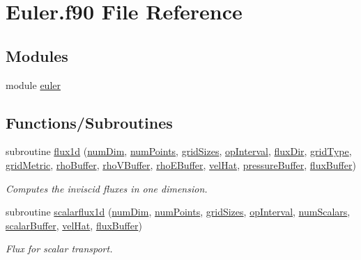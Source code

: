 \hypertarget{Euler_8f90}{}\section{Euler.\+f90 File Reference}
\label{Euler_8f90}
\subsection*{Modules}
\begin{DoxyCompactItemize}
\item 
module \hyperlink{namespaceeuler}{euler}
\end{DoxyCompactItemize}
\subsection*{Functions/\+Subroutines}
\begin{DoxyCompactItemize}
\item 
subroutine \hyperlink{namespaceeuler_a75d1a7e992d0b046ee381c90d22d4c44}{flux1d} (\hyperlink{SATKernels_8H_a680185db8546de161968dabace9e94f1}{num\+Dim}, \hyperlink{ViscidKernels_8H_adf0bf75d0875d1bb42a5348bee7b7bfd}{num\+Points}, \hyperlink{ViscidKernels_8H_a969a5d6106eec8b7096250b27865b9ba}{grid\+Sizes}, \hyperlink{WENOKernels_8H_a23d86f4608a92738225f87574392b273}{op\+Interval}, \hyperlink{ViscidKernels_8H_a466b72ae195460a9c9f2d36373803dc5}{flux\+Dir}, \hyperlink{WENOKernels_8H_ab35a6cf312bb0fddda7097a149c3e946}{grid\+Type}, \hyperlink{WENOKernels_8H_a901f07fa4e3f966a2f6951d6c5974e89}{grid\+Metric}, \hyperlink{WENOKernels_8H_a7f8551332dfedc9c12724ab3903db88c}{rho\+Buffer}, \hyperlink{WENOKernels_8H_aaddaafee4b407fa52d0756171ec50a51}{rho\+V\+Buffer}, \hyperlink{WENOKernels_8H_a355f99edd58be395aedbe083ffca12b0}{rho\+E\+Buffer}, \hyperlink{MetricKernels_8H_a05a5c93e8f43d622b504e02893ae3d66}{vel\+Hat}, \hyperlink{WENOKernels_8H_ad7fb6f5370938321db995446ba47c04b}{pressure\+Buffer}, \hyperlink{ViscidKernels_8H_abbdaff041c5151009f87fbae1b58e666}{flux\+Buffer})
\begin{DoxyCompactList}\small\item\em Computes the inviscid fluxes in one dimension. \end{DoxyCompactList}\item 
subroutine \hyperlink{namespaceeuler_ab9baf301102dd29f97d17d6550f7b527}{scalarflux1d} (\hyperlink{SATKernels_8H_a680185db8546de161968dabace9e94f1}{num\+Dim}, \hyperlink{ViscidKernels_8H_adf0bf75d0875d1bb42a5348bee7b7bfd}{num\+Points}, \hyperlink{ViscidKernels_8H_a969a5d6106eec8b7096250b27865b9ba}{grid\+Sizes}, \hyperlink{WENOKernels_8H_a23d86f4608a92738225f87574392b273}{op\+Interval}, \hyperlink{WENOKernels_8H_a653618c9ce0046e8ef3b30321ea41f98}{num\+Scalars}, \hyperlink{WENOKernels_8H_ae53b6c0ad2686009b00d987ad35f4810}{scalar\+Buffer}, \hyperlink{MetricKernels_8H_a05a5c93e8f43d622b504e02893ae3d66}{vel\+Hat}, \hyperlink{ViscidKernels_8H_abbdaff041c5151009f87fbae1b58e666}{flux\+Buffer})
\begin{DoxyCompactList}\small\item\em Flux for scalar transport. \end{DoxyCompactList}\end{DoxyCompactItemize}

